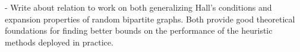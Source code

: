 - Write about relation to work on both generalizing Hall's conditions and expansion properties of random bipartite graphs. Both provide good theoretical foundations for finding better bounds on the performance of the heuristic methods deployed in practice.














